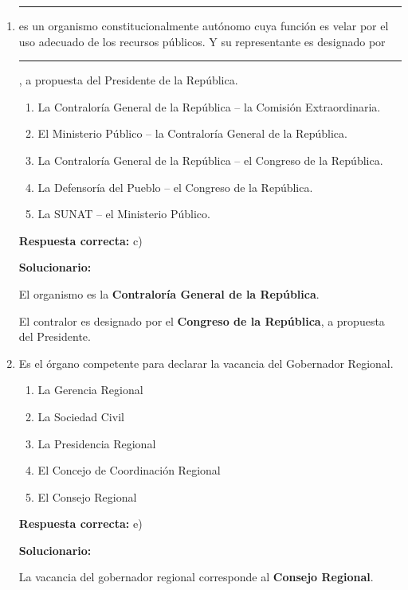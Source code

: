 \begin{enumerate}[resume]
	\item \rule{2cm}{0.15mm} es un organismo constitucionalmente autónomo cuya función es velar por el uso adecuado de los recursos públicos. Y su representante es designado por \rule{2cm}{0.15mm}, a propuesta del Presidente de la República.
	\begin{enumerate}[label=\alph*)]
		\item La Contraloría General de la República -- la Comisión Extraordinaria.
		\item El Ministerio Público -- la Contraloría General de la República.
		\item La Contraloría General de la República -- el Congreso de la República.
		\item La Defensoría del Pueblo -- el Congreso de la República.
		\item La SUNAT -- el Ministerio Público.
	\end{enumerate}
	\textbf{Respuesta correcta:} c)
	
	\vspace{2mm}
	\textbf{Solucionario:}
	
	El organismo es la \textbf{Contraloría General de la República}.
	
	El contralor es designado por el \textbf{Congreso de la República}, a propuesta del Presidente.
	

	
	\vspace{6mm}
	
	\item Es el órgano competente para declarar la vacancia del Gobernador Regional.
	\begin{enumerate}[label=\alph*)]
		\item La Gerencia Regional
		\item La Sociedad Civil
		\item La Presidencia Regional
		\item El Concejo de Coordinación Regional
		\item El Consejo Regional
	\end{enumerate}
	\textbf{Respuesta correcta:} e)
	
	\vspace{2mm}
	\textbf{Solucionario:}
	
	La vacancia del gobernador regional corresponde al \textbf{Consejo Regional}.
	

	
	\vspace{6mm}
\end{enumerate}

